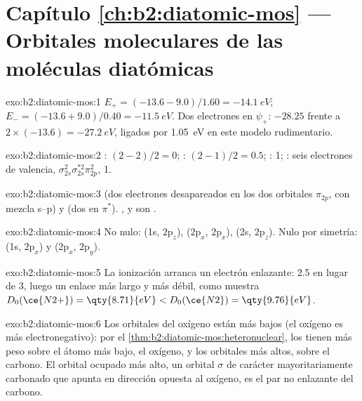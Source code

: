 \section*{Capítulo \ref{ch:b2:diatomic-mos} --- Orbitales moleculares de las moléculas diatómicas}

\begin{solution}{exo:b2:diatomic-mos:1}
$E_+ = (-13.6 - 9.0)/1.60 = \qty{-14.1}{eV}$; $E_- = (-13.6 + 9.0)/0.40 = \qty{-11.5}{eV}$.
Dos electrones en $\psi_+$: $-28.25$ frente a $2 \times (-13.6) = \qty{-27.2}{eV}$, ligados por
\qty{1.05}{eV} en este modelo rudimentario.
\end{solution}

\begin{solution}{exo:b2:diatomic-mos:2}
: $(2 - 2)/2 = 0$; : $(2 - 1)/2 = 0.5$; : 1; : seis electrones de
valencia, $\sigma_{2s}^2\sigma_{2s}^{*2}\pi_{2p}^2$,  1.
\end{solution}

\begin{solution}{exo:b2:diatomic-mos:3}
 (dos electrones desapareados en los dos orbitales $\pi_{2p}$, con mezcla s--p) y
 (dos en $\pi^*$). ,  y  son .
\end{solution}

\begin{solution}{exo:b2:diatomic-mos:4}
No nulo: (1s, $2\mathrm p_z$), ($2\mathrm p_x$, $2\mathrm p_x$), (2s, $2\mathrm p_z$).
Nulo por simetría: (1s, $2\mathrm p_x$) y ($2\mathrm p_x$, $2\mathrm p_y$).
\end{solution}

\begin{solution}{exo:b2:diatomic-mos:5}
La ionización arranca un electrón enlazante:  2.5 en lugar de 3, luego un enlace más largo y
más débil, como muestra $D_0(\ce{N2+}) = \qty{8.71}{eV} < D_0(\ce{N2}) = \qty{9.76}{eV}$.
\end{solution}

\begin{solution}{exo:b2:diatomic-mos:6}
Los orbitales del oxígeno están más bajos (el oxígeno es más electronegativo): por el
\cref{thm:b2:diatomic-mos:heteronuclear}, los  tienen más peso sobre el
átomo más bajo, el oxígeno, y los orbitales más altos, sobre el carbono. El orbital ocupado
más alto, un orbital $\sigma$ de carácter mayoritariamente carbonado que apunta en dirección opuesta al oxígeno, es
el par no enlazante del carbono.
\end{solution}

